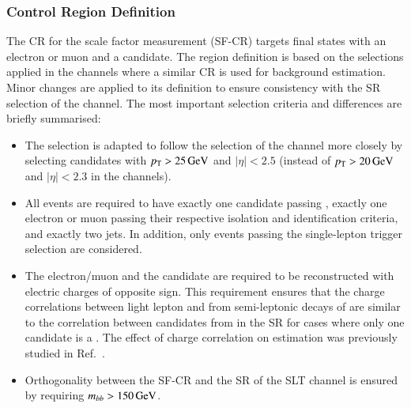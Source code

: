 \subsubsection{Control Region Definition}

The CR for the scale factor measurement (SF-CR) targets final states with an
electron or muon and a \tauhadvis candidate. The region definition is based on
the selections applied in the \lephad channels where a similar CR is used for
\faketauhadvis background estimation. Minor changes are applied to its
definition to ensure consistency with the SR selection of the \hadhad
channel. The most important selection criteria and differences are briefly
summarised:
\begin{itemize}

\item The \tauhadvis selection is adapted to follow the selection of
  the \hadhad channel more closely by selecting candidates with
  $p_{\text{T}} > \SI{25}{\ensuremath{\text{GeV}}}$ and $|\eta| < \num{2.5}$ (instead of
  $\pT > \SI{20}{\GeV}$ and $|\eta| < \num{2.3}$ in the \lephad
  channels).

\item All events are required to have exactly one \tauhadvis candidate passing
  \tauid, exactly one electron or muon passing their respective isolation and
  identification criteria, and exactly two \btagged jets. In addition, only
  events passing the single-lepton trigger selection are considered.

\item The electron/muon and the \tauhadvis candidate are required to be
  reconstructed with electric charges of opposite sign. This requirement ensures
  that the charge correlations between light lepton and \faketauhadvis from
  semi-leptonic decays of \ttbar are similar to the correlation between
  \tauhadvis candidates from \ttbarFakes in the \hadhad SR for cases where only
  one candidate is a \faketauhadvis. The effect of charge correlation on
  \ttbarFakes estimation was previously studied in Ref.~\cite{bokan}.

\item Orthogonality between the SF-CR and the SR of the \lephad SLT channel is
  ensured by requiring $m_{bb} > \SI{150}{\ensuremath{\text{GeV}}}$.

\end{itemize}


